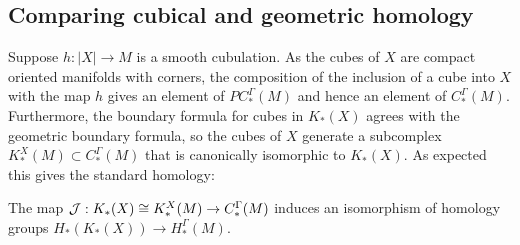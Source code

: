 \subsection{Comparing cubical and geometric homology}\label{S: cubical and geometric homology}

Suppose $h: |X| \to M$ is a smooth cubulation. As the cubes of $X$ are compact oriented manifolds with corners, the composition of the inclusion of a cube into $X$ with the map $h$ gives an element of $PC_*^\Gamma(M)$ and hence an element of $C_*^\Gamma(M)$. Furthermore, the boundary formula for cubes in $K_*(X)$ agrees with the geometric boundary formula, so the cubes of $X$ generate a subcomplex $K^X_*(M) \subset C^\Gamma_*(M)$ that is canonically isomorphic to $K_*(X)$. As expected this gives the standard homology:

\begin{theorem}\label{T: cubical homology iso}
The map $\mathcal{J}: K_*(X) \cong K^X_*(M) \to C^\Gamma_*(M)$ induces an isomorphism of homology groups $H_*(K_*(X)) \to H_*^\Gamma(M)$.
\end{theorem}
